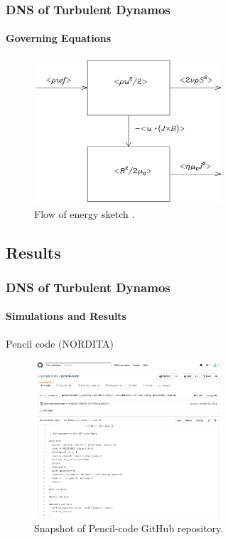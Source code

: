 \documentclass{beamer}
\begin{document}
\begin{frame}
 \frametitle{DNS of Turbulent Dynamos}
 \framesubtitle{Governing Equations}

 \begin{figure}[t]
  \includegraphics[width=7cm]{img/reservoirs}
  \caption{Flow of energy sketch \cite{brandenburg2014magnetic}.}
  \centering
 \end{figure}

\end{frame}

\subsection{Results}

\begin{frame}
 \frametitle{DNS of Turbulent Dynamos}
 \framesubtitle{Simulations and Results}
 
 Pencil code (NORDITA)
 
 \begin{figure}[t]
  \includegraphics[width=7cm]{img/pencil-code}
  \caption{Snapshot of Pencil-code GitHub repository.}
  \centering
 \end{figure}
 
\end{frame}
\end{document}
